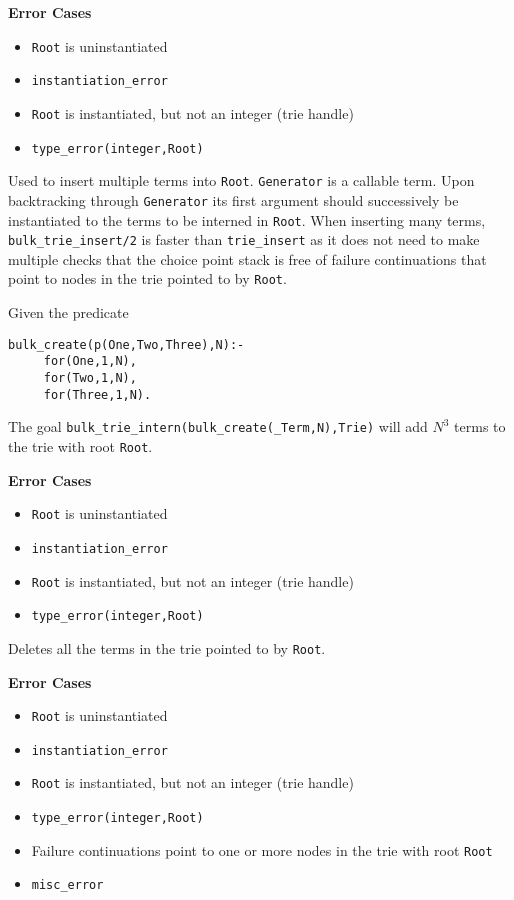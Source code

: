 \begin{description}
{\bf Error Cases}
\begin{itemize}
\item 	{\tt Root} is uninstantiated
\bi
\item 	 {\tt instantiation\_error}
\ei
\item 	{\tt Root} is instantiated, but not an integer (trie handle)
\bi
\item 	 {\tt type\_error(integer,Root)}
\ei
\end{itemize}

% 
Used to insert multiple terms into {\tt Root}.  {\tt Generator} is a
callable term.  Upon backtracking through {\tt Generator} its first
argument should successively be instantiated to the terms to be
interned in {\tt Root}.  When inserting many terms, {\tt
  bulk\_trie\_insert/2} is faster than {\tt trie\_insert} as it does
not need to make multiple checks that the choice point stack is free
of failure continuations that point to nodes in the trie pointed to by
{\tt Root}.

\begin{example} \rm
Given the predicate 
\begin{verbatim}
bulk_create(p(One,Two,Three),N):- 
     for(One,1,N),
     for(Two,1,N),
     for(Three,1,N).
\end{verbatim}
The goal {\tt bulk\_trie\_intern(bulk\_create(\_Term,N),Trie)} will
add $N^3$ terms to the trie with root {\tt Root}.
\end{example}

{\bf Error Cases}
\begin{itemize}
\item 	{\tt Root} is uninstantiated
\bi
\item 	 {\tt instantiation\_error}
\ei
\item 	{\tt Root} is instantiated, but not an integer (trie handle)
\bi
\item 	 {\tt type\_error(integer,Root)}
\ei
\end{itemize}

 
Deletes all the terms in the trie pointed to by {\tt Root}.

{\bf Error Cases}
\begin{itemize}
\item 	{\tt Root} is uninstantiated
\bi
\item 	 {\tt instantiation\_error}
\ei
\item 	{\tt Root} is instantiated, but not an integer (trie handle)
\bi
\item 	 {\tt type\_error(integer,Root)}
\ei
\item 	Failure continuations point to one or more nodes in the trie with root {\tt Root}
\bi
\item 	{\tt misc\_error}
\ei
\end{itemize}
\end{description}

